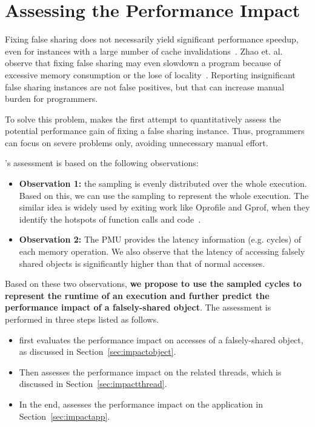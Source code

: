 \section{Assessing the Performance Impact}

\label{sec:predictimprove}
Fixing false sharing does not necessarily yield significant performance speedup, even for instances with a large number of cache invalidations~\cite{Sheriff, Predator}. Zhao et. al. observe that fixing false sharing may even slowdown a program because of excessive memory consumption or the lose of locality~\cite{qinzhao}. Reporting insignificant false sharing instances are not false positives, but that can increase manual burden for programmers.

To solve this problem, \cheetah{} makes the first attempt to quantitatively assess the potential performance gain of fixing a false sharing instance. Thus, programmers can focus on severe problems only, avoiding unnecessary manual effort.

\cheetah{}'s assessment is based on the following observations:

\begin{itemize}
\item {\bf Observation 1:} the sampling is evenly distributed over the whole execution. Based on this, we can use the sampling to represent the whole execution. The similar idea is widely used by exiting work like Oprofile and Gprof, when they identify the hotspots of function calls and code~\cite{oprofile, DBLP:conf/sigplan/GrahamKM82}.

\item {\bf Observation 2:} The PMU provides the latency information (e.g. cycles) of each memory operation. We also observe that the latency of accessing falsely shared objects is significantly higher than that of normal accesses. 

\end{itemize}

Based on these two observations, {\bf we propose to use the sampled cycles to represent the runtime of an execution and further predict the performance impact of a falsely-shared object}. The assessment is performed in three steps listed as follows. 

\begin{itemize}
\item \cheetah{} first evaluates the performance impact on accesses of a falsely-shared object, as discussed in Section~\ref{sec:impactobject}. 

\item Then \cheetah{} assesses the performance impact on the related threads, which is discussed in Section~\ref{sec:impactthread}. 
 
\item In the end, \cheetah{} assesses the performance impact on the application in Section~\ref{sec:impactapp}. 
\end{itemize}


